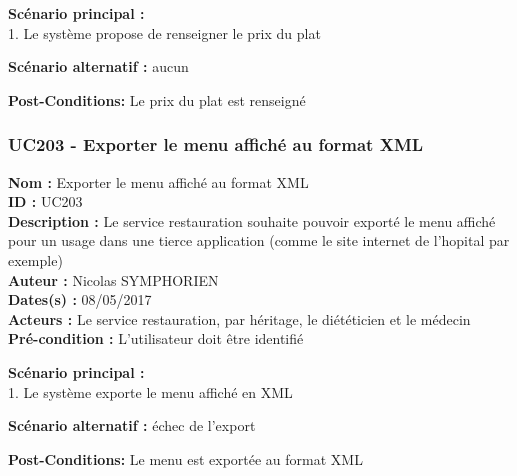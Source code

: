 \textbf{Scénario principal :}\\
1. Le système propose de renseigner le prix du plat

\textbf{Scénario alternatif :} aucun

\textbf{Post-Conditions:} Le prix du plat est renseigné

\subsubsection{UC203 - Exporter le menu affiché au format
XML}\label{uc203---exporter-le-menu-affichuxe9-au-format-xml}

\noindent\textbf{Nom :} Exporter le menu affiché au format XML\\
\textbf{ID :} UC203\\
\textbf{Description :} Le service restauration souhaite pouvoir exporté
le menu affiché pour un usage dans une tierce application (comme le site
internet de l'hopital par exemple)\\
\textbf{Auteur :} Nicolas SYMPHORIEN\\
\textbf{Dates(s) :} 08/05/2017\\
\textbf{Acteurs :} Le service restauration, par héritage, le diététicien
et le médecin\\
\textbf{Pré-condition :} L'utilisateur doit être identifié

\textbf{Scénario principal :}\\
1. Le système exporte le menu affiché en XML

\textbf{Scénario alternatif :} échec de l'export

\textbf{Post-Conditions:} Le menu est exportée au format XML
